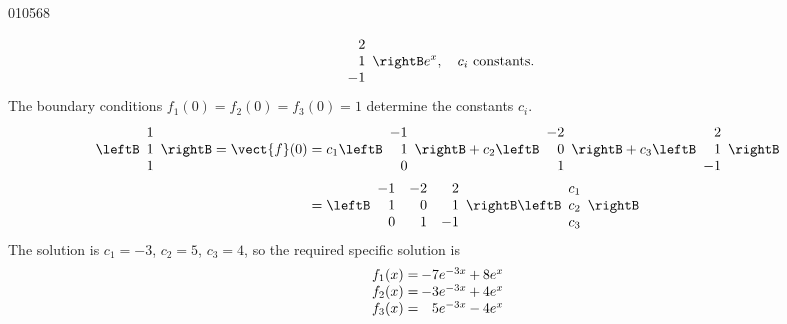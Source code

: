 \begin{example}{}{010568}
\begin{solution}
\begin{equation*}
\begin{array}{r}
2 \\
1 \\
-1
\end{array}\rightB e^x, \quad c_i \mbox{ constants.}
\end{equation*}
The boundary conditions $f_{1}(0) = f_{2}(0) = f_{3}(0) = 1$ determine the constants $c_{i}$.
\begin{align*}
\leftB \begin{array}{c}
1 \\
1 \\
1
\end{array}\rightB = \vect{f}(0) &= c_1\leftB \begin{array}{r}
-1 \\
1 \\
0
\end{array}\rightB + c_2\leftB \begin{array}{r}
-2 \\
0 \\
1
\end{array}\rightB  + c_3\leftB \begin{array}{r}
2 \\
1 \\
-1
\end{array}\rightB \\
&= \leftB \begin{array}{rrr}
-1 & -2 & 2 \\
1 & 0 & 1 \\
0 & 1 & -1
\end{array}\rightB \leftB \begin{array}{c}
c_1 \\
c_2 \\
c_3
\end{array}\rightB
\end{align*}
The solution is $c_{1} = -3$, $c_{2} = 5$, $c_{3} = 4$, so the required specific solution is
\begin{equation*}
\arraycolsep=1pt
\begin{array}{rrrr}
f_1(x)  = & -7e^{-3x} & + & 8e^x \\
f_2(x)  = & -3e^{-3x} & + & 4e^x \\
f_3(x)  = & 5e^{-3x} & - & 4e^x 
\end{array}
\end{equation*}
\end{solution}
\end{example} 
